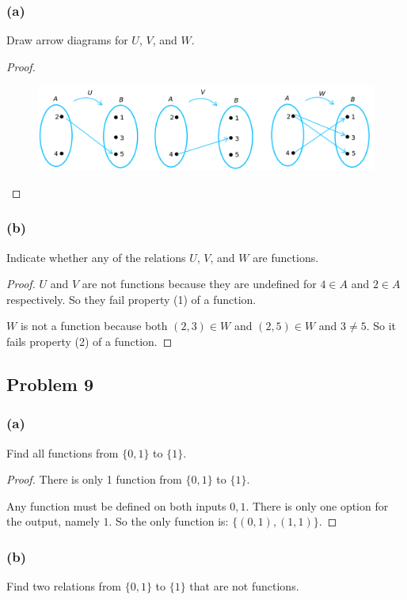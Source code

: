 \documentclass[14pt]{extarticle}
\begin{document}
\subsubsection{(a)}
Draw arrow diagrams for $U$, $V$, and $W$.

\begin{proof}
\begin{figure}[ht!]
\centering
\includegraphics[scale=0.5]{../images/1.3.8.png}
\end{figure}
\end{proof}

\subsubsection{(b)}
Indicate whether any of the relations $U$, $V$, and $W$ are functions.

\begin{proof}
$U$ and $V$ are not functions because they are undefined for $4 \in A$ and
$2 \in A$ respectively. So they fail property (1) of a function.

$W$ is not a function because both $(2, 3) \in W$ and $(2, 5) \in W$ and
$3 \neq 5$. So it fails property (2) of a function.
\end{proof}

\subsection{Problem 9}

\subsubsection{(a)}
Find all functions from $\{0, 1\}$ to $\{1\}$.

\begin{proof}
There is only 1 function from $\{0, 1\}$ to $\{1\}$.

Any function must be defined on both inputs $0, 1$. There is only one option for
the output, namely $1$. So the only function is: $\{(0, 1), (1, 1)\}$.
\end{proof}

\subsubsection{(b)}
Find two relations from $\{0, 1\}$ to $\{1\}$ that are not functions.
\end{document}
